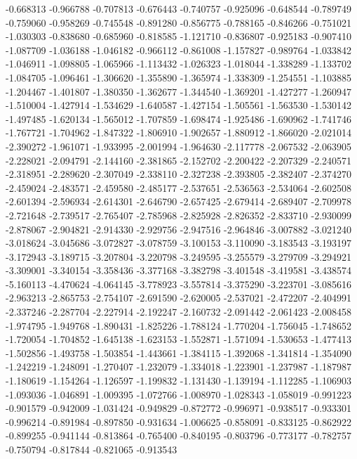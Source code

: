 -0.668313
-0.966788
-0.707813
-0.676443
-0.740757
-0.925096
-0.648544
-0.789749
-0.759060
-0.958269
-0.745548
-0.891280
-0.856775
-0.788165
-0.846266
-0.751021
-1.030303
-0.838680
-0.685960
-0.818585
-1.121710
-0.836807
-0.925183
-0.907410
-1.087709
-1.036188
-1.046182
-0.966112
-0.861008
-1.157827
-0.989764
-1.033842
-1.046911
-1.098805
-1.065966
-1.113432
-1.026323
-1.018044
-1.338289
-1.133702
-1.084705
-1.096461
-1.306620
-1.355890
-1.365974
-1.338309
-1.254551
-1.103885
-1.204467
-1.401807
-1.380350
-1.362677
-1.344540
-1.369201
-1.427277
-1.260947
-1.510004
-1.427914
-1.534629
-1.640587
-1.427154
-1.505561
-1.563530
-1.530142
-1.497485
-1.620134
-1.565012
-1.707859
-1.698474
-1.925486
-1.690962
-1.741746
-1.767721
-1.704962
-1.847322
-1.806910
-1.902657
-1.880912
-1.866020
-2.021014
-2.390272
-1.961071
-1.933995
-2.001994
-1.964630
-2.117778
-2.067532
-2.063905
-2.228021
-2.094791
-2.144160
-2.381865
-2.152702
-2.200422
-2.207329
-2.240571
-2.318951
-2.289620
-2.307049
-2.338110
-2.327238
-2.393805
-2.382407
-2.374270
-2.459024
-2.483571
-2.459580
-2.485177
-2.537651
-2.536563
-2.534064
-2.602508
-2.601394
-2.596934
-2.614301
-2.646790
-2.657425
-2.679414
-2.689407
-2.709978
-2.721648
-2.739517
-2.765407
-2.785968
-2.825928
-2.826352
-2.833710
-2.930099
-2.878067
-2.904821
-2.914330
-2.929756
-2.947516
-2.964846
-3.007882
-3.021240
-3.018624
-3.045686
-3.072827
-3.078759
-3.100153
-3.110090
-3.183543
-3.193197
-3.172943
-3.189715
-3.207804
-3.220798
-3.249595
-3.255579
-3.279709
-3.294921
-3.309001
-3.340154
-3.358436
-3.377168
-3.382798
-3.401548
-3.419581
-3.438574
-5.160113
-4.470624
-4.064145
-3.778923
-3.557814
-3.375290
-3.223701
-3.085616
-2.963213
-2.865753
-2.754107
-2.691590
-2.620005
-2.537021
-2.472207
-2.404991
-2.337246
-2.287704
-2.227914
-2.192247
-2.160732
-2.091442
-2.061423
-2.008458
-1.974795
-1.949768
-1.890431
-1.825226
-1.788124
-1.770204
-1.756045
-1.748652
-1.720054
-1.704852
-1.645138
-1.623153
-1.552871
-1.571094
-1.530653
-1.477413
-1.502856
-1.493758
-1.503854
-1.443661
-1.384115
-1.392068
-1.341814
-1.354090
-1.242219
-1.248091
-1.270407
-1.232079
-1.334018
-1.223901
-1.237987
-1.187987
-1.180619
-1.154264
-1.126597
-1.199832
-1.131430
-1.139194
-1.112285
-1.106903
-1.093036
-1.046891
-1.009395
-1.072766
-1.008970
-1.028343
-1.058019
-0.991223
-0.901579
-0.942009
-1.031424
-0.949829
-0.872772
-0.996971
-0.938517
-0.933301
-0.996214
-0.891984
-0.897850
-0.931634
-1.006625
-0.858091
-0.833125
-0.862922
-0.899255
-0.941144
-0.813864
-0.765400
-0.840195
-0.803796
-0.773177
-0.782757
-0.750794
-0.817844
-0.821065
-0.913543
